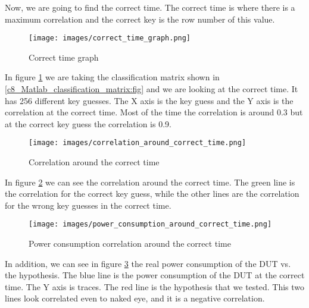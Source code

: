 Now, we are going to find the correct time. The correct time is where there is a maximum correlation and the correct key is the row number of this value. 
\begin{figure}[H]
    \centering
    \texttt{[image: images/correct\_time\_graph.png]}
    \caption{Correct time graph} \label{c8_Matlab_correct_time:fig}
\end{figure}
In figure \ref{c8_Matlab_correct_time:fig} we are taking the classification matrix shown in \ref{c8_Matlab_classification_matrix:fig}  and we are looking at the correct time. It has 256 different key guesses. The X axis is the key guess and the Y axis is the correlation at the correct time. Most of the time the correlation is around 0.3 but at the correct key guess the correlation is 0.9. 
\begin{figure}[H]
    \centering
    \texttt{[image: images/correlation\_around\_correct\_time.png]}
    \caption{Correlation around the correct time} \label{c8_Matlab_correlation_around_the_correct_time:fig}
\end{figure}

In figure \ref{c8_Matlab_correlation_around_the_correct_time:fig} we can see the correlation around the correct time. The green line is the correlation for the correct key guess, while the other lines are the correlation for the wrong key guesses in the correct time.
\begin{figure}[H]
    \centering
    \texttt{[image: images/power\_consumption\_around\_correct\_time.png]}
    \caption{Power consumption correlation around the correct time} \label{c8_Matlab_power_consumption_correlation_around_the_correct_time:fig}
\end{figure}
In addition, we can see in figure \ref{c8_Matlab_power_consumption_correlation_around_the_correct_time:fig} the real power consumption of the DUT vs. the hypothesis.
The blue line is the power consumption of the DUT at the correct time. The Y axis is traces. The red line is the hypothesis that we tested. This two lines look correlated even to naked eye, and it  is a negative correlation.